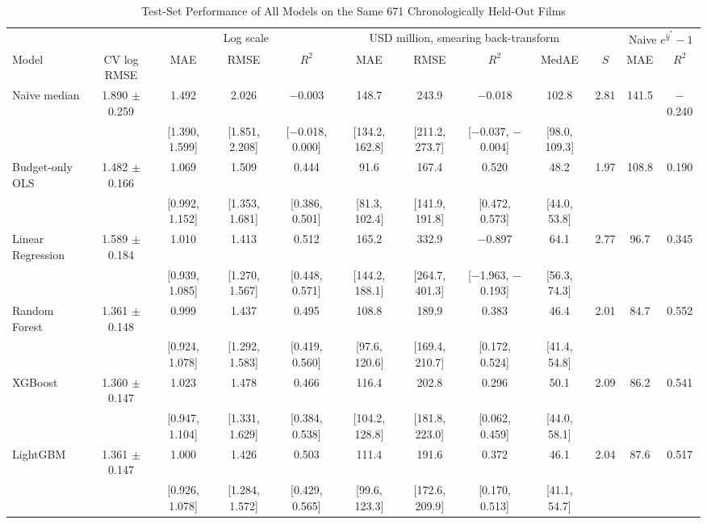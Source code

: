 \begin{table}[!t]
\centering
\caption{Test-Set Performance of All Models on the Same 671 Chronologically Held-Out Films}
\label{tab:main}
\scriptsize
\setlength{\tabcolsep}{2.6pt}
\begin{tabular}{@{}lccccccccccc@{}}
\toprule
 & & \multicolumn{3}{c}{Log scale} & \multicolumn{4}{c}{USD million, smearing back-transform} &  & \multicolumn{2}{c}{Naive $e^{\hat y^*}-1$} \\
\cmidrule(lr){3-5}\cmidrule(lr){6-9}\cmidrule(lr){11-12}
Model & CV log RMSE & MAE & RMSE & $R^2$ & MAE & RMSE & $R^2$ & MedAE & $S$ & MAE & $R^2$ \\
\midrule
Naive median & 1.890 $\pm$ 0.259 & 1.492 & 2.026 & $-$0.003 & 148.7 & 243.9 & $-$0.018 & 102.8 & 2.81 & 141.5 & $-$0.240 \\
 &  & [1.390, 1.599] & [1.851, 2.208] & [$-$0.018, 0.000] & [134.2, 162.8] & [211.2, 273.7] & [$-$0.037, $-$0.004] & [98.0, 109.3] &  &  &  \\[2pt]
Budget-only OLS & 1.482 $\pm$ 0.166 & 1.069 & 1.509 & 0.444 & 91.6 & 167.4 & 0.520 & 48.2 & 1.97 & 108.8 & 0.190 \\
 &  & [0.992, 1.152] & [1.353, 1.681] & [0.386, 0.501] & [81.3, 102.4] & [141.9, 191.8] & [0.472, 0.573] & [44.0, 53.8] &  &  &  \\[2pt]
Linear Regression & 1.589 $\pm$ 0.184 & 1.010 & 1.413 & 0.512 & 165.2 & 332.9 & $-$0.897 & 64.1 & 2.77 & 96.7 & 0.345 \\
 &  & [0.939, 1.085] & [1.270, 1.567] & [0.448, 0.571] & [144.2, 188.1] & [264.7, 401.3] & [$-$1.963, $-$0.193] & [56.3, 74.3] &  &  &  \\[2pt]
\midrule
Random Forest & 1.361 $\pm$ 0.148 & 0.999 & 1.437 & 0.495 & 108.8 & 189.9 & 0.383 & 46.4 & 2.01 & 84.7 & 0.552 \\
 &  & [0.924, 1.078] & [1.292, 1.583] & [0.419, 0.560] & [97.6, 120.6] & [169.4, 210.7] & [0.172, 0.524] & [41.4, 54.8] &  &  &  \\[2pt]
XGBoost & 1.360 $\pm$ 0.147 & 1.023 & 1.478 & 0.466 & 116.4 & 202.8 & 0.296 & 50.1 & 2.09 & 86.2 & 0.541 \\
 &  & [0.947, 1.104] & [1.331, 1.629] & [0.384, 0.538] & [104.2, 128.8] & [181.8, 223.0] & [0.062, 0.459] & [44.0, 58.1] &  &  &  \\[2pt]
LightGBM & 1.361 $\pm$ 0.147 & 1.000 & 1.426 & 0.503 & 111.4 & 191.6 & 0.372 & 46.1 & 2.04 & 87.6 & 0.517 \\
 &  & [0.926, 1.078] & [1.284, 1.572] & [0.429, 0.565] & [99.6, 123.3] & [172.6, 209.9] & [0.170, 0.513] & [41.1, 54.7] &  &  &  \\[2pt]

\end{tabular}
\end{table}
